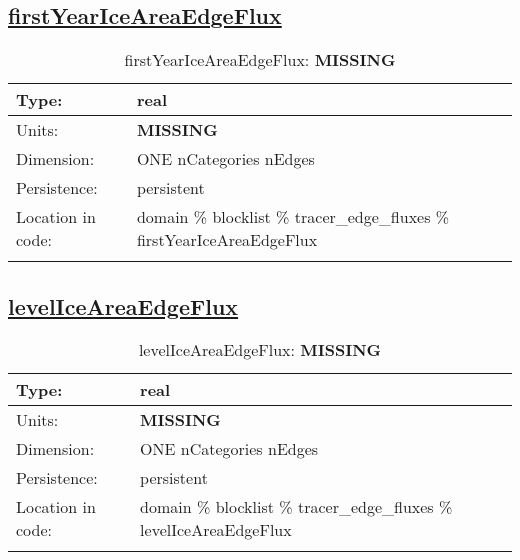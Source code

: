 \subsection[firstYearIceAreaEdgeFlux]{\hyperref[sec:var_tab_tracer_edge_fluxes]{firstYearIceAreaEdgeFlux}}
\label{subsec:var_sec_tracer_edge_fluxes_firstYearIceAreaEdgeFlux}
\begin{center}
\begin{longtable}{| p{2.0in} | p{4.0in} |}
        \hline 
        Type: & real \\
        \hline 
        Units: & {\bf \color{red} MISSING} \\
        \hline 
        Dimension: & ONE nCategories nEdges \\
        \hline 
        Persistence: & persistent \\
        \hline 
         Location in code: & domain \% blocklist \% tracer\_edge\_fluxes \% firstYearIceAreaEdgeFlux \\
         \hline 
    \caption{firstYearIceAreaEdgeFlux: {\bf \color{red} MISSING}}
\end{longtable}
\end{center}
\subsection[levelIceAreaEdgeFlux]{\hyperref[sec:var_tab_tracer_edge_fluxes]{levelIceAreaEdgeFlux}}
\label{subsec:var_sec_tracer_edge_fluxes_levelIceAreaEdgeFlux}
\begin{center}
\begin{longtable}{| p{2.0in} | p{4.0in} |}
        \hline 
        Type: & real \\
        \hline 
        Units: & {\bf \color{red} MISSING} \\
        \hline 
        Dimension: & ONE nCategories nEdges \\
        \hline 
        Persistence: & persistent \\
        \hline 
         Location in code: & domain \% blocklist \% tracer\_edge\_fluxes \% levelIceAreaEdgeFlux \\
         \hline 
    \caption{levelIceAreaEdgeFlux: {\bf \color{red} MISSING}}
\end{longtable}
\end{center}
